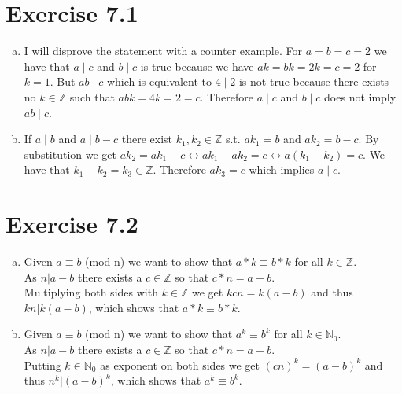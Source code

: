 \documentclass{article} %
\newcommand{\homeworkNumber}{7}
\begin{document}
\section*{Exercise \homeworkNumber.1}

\begin{enumerate}[(a)]
	\item I will disprove the statement with a counter example. For \( a = b = c = 2 \) we have that \( a \mid c \) and \( b \mid c \) is true because we have \( ak = bk = 2k = c = 2 \) for \( k = 1 \). But \( ab \mid c \) which is equivalent to \( 4 \mid 2 \) is not true because there exists no \( k \in \mathbb{Z} \) such that \( abk = 4k = 2 = c\). Therefore \( a \mid c \) and \( b \mid c \) does not imply \( ab \mid c \).
	\item If \( a \mid b \) and \( a \mid b-c \) there exist \( k_{1}, k_{2} \in  \mathbb{Z} \) s.t. \( ak_{1} = b \) and \( ak_{2}=b-c \). By substitution we get \( ak_{2} = ak_{1}-c \leftrightarrow ak_{1} - ak_{2} = c \leftrightarrow a(k_{1}-k_{2}) = c \). We have that \( k_{1}-k_{2} = k_{3} \in \mathbb{Z} \). Therefore \( ak_{3} = c \) which implies \( a \mid c \).
\end{enumerate}



\section*{Exercise \homeworkNumber.2}

\begin{enumerate}[(a)]
	\item
	      Given $a \equiv b $ (mod n) we want to show that $a*k \equiv b*k$ for all $k \in \mathbb Z$.\\
	      As $n \lvert a-b$ there exists a $c \in \mathbb Z$ so that $c*n = a-b$. \\
	      Multiplying both sides with $k \in \mathbb Z$ we get $kcn = k(a-b)$ and thus $kn \lvert k(a-b)$, which shows that $a*k \equiv b*k$.
	\item
	      Given $a \equiv b $ (mod n) we want to show that $a^k \equiv b^k$ for all $k \in \mathbb N_0$. \\
	      As $n \lvert a-b$ there exists a $c \in \mathbb Z$ so that $c*n = a-b$. \\
	      Putting $k \in \mathbb N_0$ as exponent on both sides we get $(cn)^k = (a-b)^k$ and thus $n^k \lvert (a-b)^k$, which shows that $a^k \equiv b^k$.
\end{enumerate}
\end{document}
